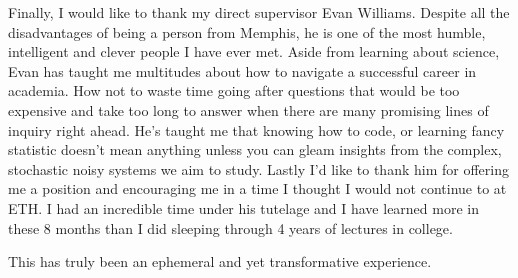 \documentclass[a4paper,11pt,twoside]{book}
\begin{document}
Finally, I would like to thank my direct supervisor Evan Williams. Despite all the disadvantages of being a person from Memphis, he is one of the most humble, intelligent and clever people I have ever met. Aside from learning about science, Evan has taught me multitudes about how to navigate a successful career in academia. How not to waste time going after questions that would be too expensive and take too long to answer when there are many promising lines of inquiry right ahead. He's taught me that knowing how to code, or learning fancy statistic doesn't mean anything unless you can gleam insights from the complex, stochastic noisy systems we aim to study. Lastly I'd like to thank him for offering me a position and encouraging me in a time I thought I would not continue to at ETH. I had an incredible time under his tutelage and I have learned more in these 8 months than I did sleeping through 4 years of lectures in college.

This has truly been an ephemeral and yet transformative experience. 
	
\end{document}
